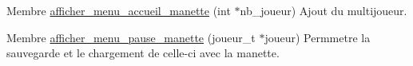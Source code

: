 
\begin{DoxyRefList}
\item[Membre \mbox{\hyperlink{menus_8h_aa1042f350a66ae56b754f3bf22556405}{afficher\+\_\+menu\+\_\+accueil\+\_\+manette}} (int $\ast$nb\+\_\+joueur)]\label{todo__todo000002}%
%
Ajout du multijoueur. 
\item[Membre \mbox{\hyperlink{menus_8h_a4da3c6c1c4423889f8735c91a92e20d9}{afficher\+\_\+menu\+\_\+pause\+\_\+manette}} (joueur\+\_\+t $\ast$joueur)]\label{todo__todo000001}%
%
Permmetre la sauvegarde et le chargement de celle-\/ci avec la manette.
\end{DoxyRefList}